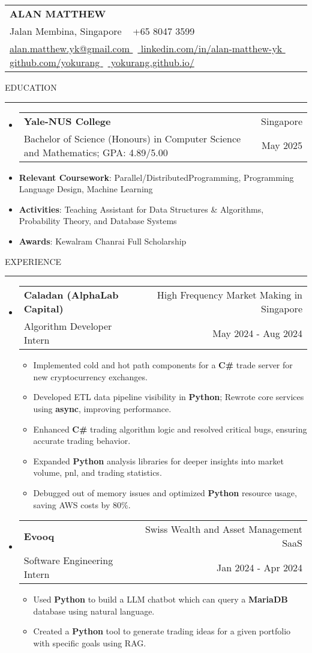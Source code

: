 \documentclass[letterpaper, 11pt]{article}
\makeatletter
\def\sectionlineskip{\medskip}
\def\sectionskip{\medskip}
\def\namesize{\LARGE}
\newcommand{\ResumeHeader}[6]{
  \noindent
  \begin{tabularx}{\textwidth}{>{\centering\arraybackslash}X}
    \namesize\MakeUppercase{\textbf{\fullname}} \\
    #1 \textbar\ #2 \\
    #3 \textbar\ #4 \textbar\ #5 \textbar\ #6 \\
  \end{tabularx}
}
\def \fullname { Alan Matthew }
\def \linkedinlink { https://www.linkedin.com/in/alan-matthew-yk }
\def \linkedintext { linkedin.com/in/alan-matthew-yk }
\def \phonenumber { +65 8047 3599 }
\def \githublink { https://github.com/yokurang }
\def \githubtext { github.com/yokurang }
\def \emaillink { mailto:alan.matthew.yk@gmail.com }
\def \emailtext { alan.matthew.yk@gmail.com }
\def \websitelink { https://yokurang.github.io/ }
\def \websitetext { yokurang.github.io/ }
\def \address { 9 Jalan Membina, Singapore }
\def \headertype {\ResumeHeader}
\def \linkedin {\href{\linkedinlink}{\linkedintext}}
\def \phone {{\phonenumber}}
\def \email {\href{\emaillink}{\emailtext}}
\def \github {\href{\githublink}{\githubtext}}
\def \website {\href{\websitelink}{\websitetext}}
\newcommand{\SectionHeading}[1]{
  \sectionskip
  \raggedright\raggedbottom\MakeUppercase{\large{#1}}
  \sectionlineskip
  \hrule
  \color{black}
}
\newcommand{\ResumeEntryTSDL}[4]{
  \vspace{1pt}\item
    \begin{tabular*}{\textwidth}[t]{l@{\extracolsep{\fill}}r} 
      \textbf{#1} & #2 \\
      #3 & #4 \\
    \end{tabular*}\vspace{-2.835pt} %
}
\newcommand{\ResumeItem}[2]{
  \item{
    \textbf{#1}{: #2 \vspace{-2.835pt}}
  }
}
\newcommand{\ResumeItemDefault}[1]{
  \item{
    #1 \vspace{-2.835pt}
  }
}
\newcommand{\ResumeSubItem}[2]{\ResumeItem{#1}{#2}\vspace{-2.835pt}}
\newcommand{\ResumeEntryStart}{\begin{itemize}[leftmargin=0mm, label={}]}
\newcommand{\ResumeEntryEnd}{\end{itemize}\vspace{-2.835pt}} %
\newcommand{\ResumeItemListStart}{\begin{itemize}[leftmargin=5mm, label=$\bullet$, itemsep=1mm, parsep=1mm]} %
\newcommand{\ResumeItemListEnd}{\end{itemize}}
\makeatother
\begin{document}
  \headertype{\address}{\phone}{\email}{\linkedin}{\github}{\website}
  
  \SectionHeading{Education}
  \ResumeEntryStart
    \ResumeEntryTSDL{Yale-NUS College} {Singapore}
    {Bachelor of Science (Honours) in Computer Science and Mathematics; GPA: 4.89/5.00} {May 2025}
    \ResumeSubItem{Relevant Coursework}{Parallel/DistributedProgramming, Programming Language Design, Machine Learning}
    \ResumeSubItem{Activities}{Teaching Assistant for Data Structures \& Algorithms, Probability Theory, and Database Systems}
    \ResumeSubItem{Awards}{Kewalram Chanrai Full Scholarship}
  \ResumeEntryEnd

  \vspace{5pt}

  \SectionHeading{Experience}

  \ResumeEntryStart
  \ResumeEntryTSDL{Caladan (AlphaLab Capital)}{High Frequency Market Making in Singapore}{Algorithm Developer Intern}{May 2024 - Aug 2024}
  \ResumeItemListStart
  \ResumeItemDefault{Implemented cold and hot path components for a \textbf{C\#} trade server for new cryptocurrency exchanges.}
  \ResumeItemDefault{Developed ETL data pipeline visibility in \textbf{Python}; Rewrote core services using \textbf{async}, improving performance.}
  \ResumeItemDefault{Enhanced \textbf{C\#} trading algorithm logic and resolved critical bugs, ensuring accurate trading behavior.}
  \ResumeItemDefault{Expanded \textbf{Python} analysis libraries for deeper insights into market volume, pnl, and trading statistics.}
  \ResumeItemDefault{Debugged out of memory issues and optimized \textbf{Python} resource usage, saving AWS costs by 80\%.}
  \ResumeItemListEnd
  \ResumeEntryEnd

  \ResumeEntryStart
    \ResumeEntryTSDL{Evooq}{Swiss Wealth and Asset Management SaaS}{Software Engineering Intern}{Jan 2024 - Apr 2024}
    \ResumeItemListStart
    \ResumeItemDefault{Used \textbf{Python} to build a LLM chatbot which can query a \textbf{MariaDB} database using natural language.}
    \ResumeItemDefault{Created a \textbf{Python} tool to generate trading ideas for a given portfolio with specific goals using RAG.}
    \ResumeItemListEnd
  \ResumeEntryEnd
\end{document}

